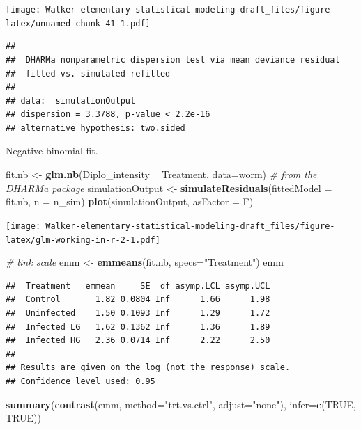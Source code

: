 \documentclass[]{book}
\newenvironment{Shaded}{\begin{snugshade}}{\end{snugshade}}
\newcommand{\KeywordTok}[1]{\textcolor[rgb]{0.13,0.29,0.53}{\textbf{#1}}}
\newcommand{\DataTypeTok}[1]{\textcolor[rgb]{0.13,0.29,0.53}{#1}}
\newcommand{\StringTok}[1]{\textcolor[rgb]{0.31,0.60,0.02}{#1}}
\newcommand{\CommentTok}[1]{\textcolor[rgb]{0.56,0.35,0.01}{\textit{#1}}}
\newcommand{\OtherTok}[1]{\textcolor[rgb]{0.56,0.35,0.01}{#1}}
\newcommand{\OperatorTok}[1]{\textcolor[rgb]{0.81,0.36,0.00}{\textbf{#1}}}
\newcommand{\NormalTok}[1]{#1}
\begin{document}
\texttt{[image: Walker-elementary-statistical-modeling-draft\_files/figure-latex/unnamed-chunk-41-1.pdf]}

\begin{verbatim}
## 
##  DHARMa nonparametric dispersion test via mean deviance residual
##  fitted vs. simulated-refitted
## 
## data:  simulationOutput
## dispersion = 3.3788, p-value < 2.2e-16
## alternative hypothesis: two.sided
\end{verbatim}

Negative binomial fit.

\begin{Shaded}
\begin{Highlighting}[]
\NormalTok{fit.nb <-}\StringTok{ }\KeywordTok{glm.nb}\NormalTok{(Diplo_intensity }\OperatorTok{~}\StringTok{ }\NormalTok{Treatment, }\DataTypeTok{data=}\NormalTok{worm)}
\CommentTok{# from the DHARMa package}
\NormalTok{  simulationOutput <-}\StringTok{ }\KeywordTok{simulateResiduals}\NormalTok{(}\DataTypeTok{fittedModel =}\NormalTok{ fit.nb, }\DataTypeTok{n =}\NormalTok{ n_sim)}
  \KeywordTok{plot}\NormalTok{(simulationOutput, }\DataTypeTok{asFactor =}\NormalTok{ F)}
\end{Highlighting}
\end{Shaded}

\texttt{[image: Walker-elementary-statistical-modeling-draft\_files/figure-latex/glm-working-in-r-2-1.pdf]}

\begin{Shaded}
\begin{Highlighting}[]
\CommentTok{# link scale}
\NormalTok{emm <-}\StringTok{ }\KeywordTok{emmeans}\NormalTok{(fit.nb, }\DataTypeTok{specs=}\StringTok{"Treatment"}\NormalTok{)}
\NormalTok{emm}
\end{Highlighting}
\end{Shaded}

\begin{verbatim}
##  Treatment   emmean     SE  df asymp.LCL asymp.UCL
##  Control       1.82 0.0804 Inf      1.66      1.98
##  Uninfected    1.50 0.1093 Inf      1.29      1.72
##  Infected LG   1.62 0.1362 Inf      1.36      1.89
##  Infected HG   2.36 0.0714 Inf      2.22      2.50
## 
## Results are given on the log (not the response) scale. 
## Confidence level used: 0.95
\end{verbatim}

\begin{Shaded}
\begin{Highlighting}[]
\KeywordTok{summary}\NormalTok{(}\KeywordTok{contrast}\NormalTok{(emm, }\DataTypeTok{method=}\StringTok{"trt.vs.ctrl"}\NormalTok{, }\DataTypeTok{adjust=}\StringTok{"none"}\NormalTok{), }\DataTypeTok{infer=}\KeywordTok{c}\NormalTok{(}\OtherTok{TRUE}\NormalTok{, }\OtherTok{TRUE}\NormalTok{))}
\end{Highlighting}
\end{Shaded}
\end{document}

